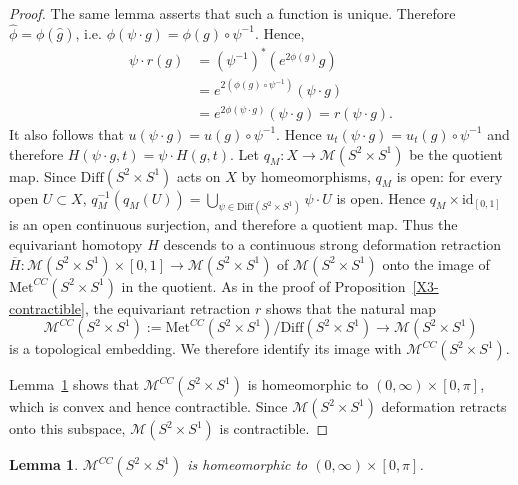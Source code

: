 \documentclass[12pt,oneside,a4paper]{article}
\theoremstyle{mytheorem}
\newtheorem{lemma}[definition]{Lemma}
\theoremstyle{remark}
\theoremstyle{definition}
\begin{document}
\begin{proof}
The same lemma asserts that such a function is unique.
Therefore $\widehat\phi=\phi(\widehat g)$, i.e.
\(
\phi(\psi\cdot g)=\phi(g)\circ\psi^{-1}.
\)
Hence,
\[
\begin{aligned}
\psi\cdot r(g)
&=(\psi^{-1})^*(e^{2\phi(g)}g)\\
&=e^{2(\phi(g)\circ\psi^{-1})}(\psi\cdot g)\\
&=e^{2\phi(\psi\cdot g)}(\psi\cdot g)
=r(\psi\cdot g).
\end{aligned}
\]
It also follows that $u(\psi\cdot g)=u(g)\circ\psi^{-1}$. Hence $u_t(\psi\cdot g)=u_t(g)\circ\psi^{-1}$ and therefore
$H(\psi\cdot g,t)=\psi\cdot H(g,t)$.
Let $q_M\colon X\to \mathcal{M}(S^2\times S^1)$ be the quotient
map. Since $\mathrm{Diff}(S^2\times S^1)$ acts on $X$ by homeomorphisms,
$q_M$ is
open: for every open $U\subset X$,
\(q_M^{-1}(q_M(U))
=
\bigcup_{\psi\in\mathrm{Diff}(S^2\times S^1)}\psi\cdot U\)
is open. Hence $q_M\times\mathrm{id}_{[0,1]}$ is an open continuous
surjection, and therefore a quotient map. Thus the equivariant homotopy $H$
descends to a continuous strong deformation retraction
\(\overline H\colon
\mathcal{M}(S^2\times S^1)\times[0,1]
\to \mathcal{M}(S^2\times S^1)\)
of $\mathcal{M}(S^2\times S^1)$ onto the image of $\mathrm{Met}^{CC}(S^2\times S^1)$ in the quotient. As in the proof of Proposition~\ref{X3-contractible}, the equivariant retraction $r$ shows that the natural map
\[
\mathcal{M}^{CC}(S^2\times S^1)
:=
\mathrm{Met}^{CC}(S^2\times S^1)/\mathrm{Diff}(S^2\times S^1)
\longrightarrow
\mathcal{M}(S^2\times S^1)
\]
is a topological embedding. We therefore identify its image with
$\mathcal{M}^{CC}(S^2\times S^1)$.

Lemma~\ref{lem:cylinder-moduli} shows that
$\mathcal{M}^{CC}(S^2\times S^1)$ is homeomorphic to
$(0,\infty)\times[0,\pi]$, which is convex and hence contractible. Since
$\mathcal{M}(S^2\times S^1)$ deformation retracts onto this subspace,
$\mathcal{M}(S^2\times S^1)$ is contractible.
\end{proof}


\begin{lemma}\label{lem:cylinder-moduli}
\(\mathcal{M}^{CC}(S^2 \times S^1)\) is homeomorphic to \((0,\infty) \times [0,\pi]\).
\end{lemma}
\end{document}
